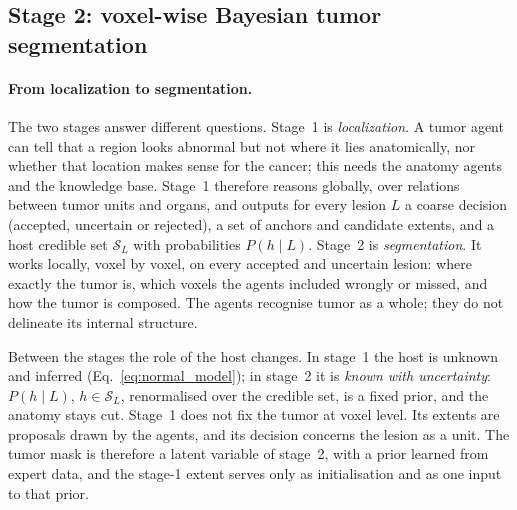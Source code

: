 \documentclass[fleqn,10pt]{olplainarticle}
\begin{document}
\subsection{Stage 2: voxel-wise Bayesian tumor segmentation}
\label{sec:stage2}

\paragraph{From localization to segmentation.} The two stages answer different questions. Stage~1 is \emph{localization}.
A tumor agent can tell that a region looks abnormal but not where it lies anatomically, nor whether that location makes
sense for the cancer; this needs the anatomy agents and the knowledge base. Stage~1 therefore reasons globally, over
relations between tumor units and organs, and outputs for every lesion $L$ a coarse decision (accepted, uncertain or
rejected), a set of anchors and candidate extents, and a host credible set $\mathcal{S}_L$ with probabilities
$P(h\mid L)$. Stage~2 is \emph{segmentation}. It works locally, voxel by voxel, on every accepted and uncertain lesion: where
exactly the tumor is, which voxels the agents included wrongly or missed, and how the tumor is composed. The agents
recognise tumor as a whole; they do not delineate its internal structure.

Between the stages the role of the host changes. In stage~1 the host is unknown and inferred
(Eq.~\eqref{eq:normal_model}); in stage~2 it is \emph{known with uncertainty}: $P(h\mid L)$, $h\in\mathcal{S}_L$,
renormalised over the credible set, is a fixed prior, and the anatomy stays cut. Stage~1 does not fix the tumor at voxel
level. Its extents are proposals drawn by the agents, and its decision concerns the lesion as a unit. The tumor mask is
therefore a latent variable of stage~2, with a prior learned from expert data, and the stage-1 extent serves only as
initialisation and as one input to that prior.
\end{document}
